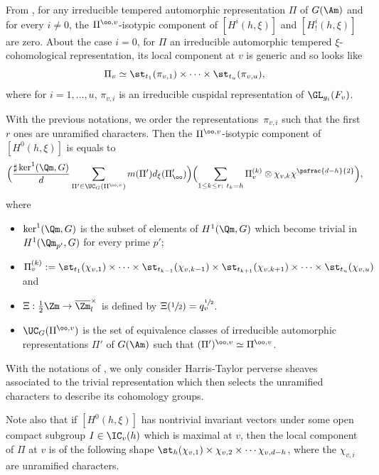 From \cite[Prop.\,3.6]{boyer-imj}, for any irreducible tempered automorphic representation
$\Pi$ of $G(\Am)$ and for every $i \neq 0$, the $\Pi^{\oo,v}$-isotypic component of
$[H^i(h,\xi)]$ and $[H^i_!(h,\xi)]$ are zero. About the case $i=0$, for $\Pi$ an irreducible
automorphic tempered $\xi$\nobreakdash-coho\-mo\-logical representation, its local component at $v$ is generic and so looks like
\[
\Pi_v \simeq \st_{t_1}(\pi_{v,1}) \times \cdots \times \st_{t_u}(\pi_{v,u}),
\]
where for $i=1,\dots,u$, $\pi_{v,i}$ is an irreducible cuspidal representation of $\GL_{g_i}(F_v)$.

\begin{prop}\label{prop-temperee-explicite}
With the previous notations, we order the representations~$\pi_{v,i}$ such that the first $r$ ones are unramified
characters. Then the $\Pi^{\oo,v}$-isotypic component of $[H^0(h,\xi)]$ is equals to
\[
\Bigl (\frac{\sharp \ker^1(\Qm,G)}{d} \sum_{\Pi' \in \UC_G(\Pi^{\oo,v})}
m(\Pi') d_\xi(\Pi'_\oo) \Bigr) \Bigl (\sum_{1 \leq k \leq r:~ t_k=h} \Pi_v^{(k)} \otimes \chi_{v,k}
\chi^{\psfrac{d-h}{2}} \Bigr),
\]
where
\begin{itemize}
\item $ \ker^1(\Qm,G)$ is the subset of elements of $H^1(\Qm,G)$ which become trivial
in $H^1(\Qm_{p'},G)$ for every prime $p'$;

\item $\Pi_v^{(k)}:= \st_{t_1}(\chi_{v,1}) \times \cdots \times \st_{t_{k-1}}(\chi_{v,k-1}) \times
\st_{t_{k+1}}(\chi_{v,k+1}) \times \cdots \times \st_{t_u}(\chi_{v,u})$ and

\item $\Xi:\frac{1}{2} \Zm \to \overline \Zm_l^\times$
is defined by $\Xi(\sfrac{1}{2})=q_v^{\sfrac{1}{2}}$.

\item $\UC_G(\Pi^{\oo,v})$ is the set of equivalence classes of irreducible automorphic
representations $\Pi'$ of $G(\Am)$ such that $(\Pi')^{\oo,v} \simeq \Pi^{\oo,v}$.
\end{itemize}
\end{prop}

\begin{remark}
With the notations of \cite{boyer-imj}, we only consider Harris-Taylor perverse
sheaves associated to the trivial representation which then selects the unramified
characters to describe its cohomology groups.

Note also that if $[H^0(h,\xi)]$ has nontrivial invariant vectors under some open
compact subgroup $I \in \IC_v(h)$ which is maximal at $v$, then the local component
of $\Pi$ at $v$ is of the following shape $\st_h(\chi_{v,1}) \times \chi_{v,2} \times \cdots \chi_{v,d-h}$,
where the $\chi_{v,i}$ are unramified characters.
\end{remark}

